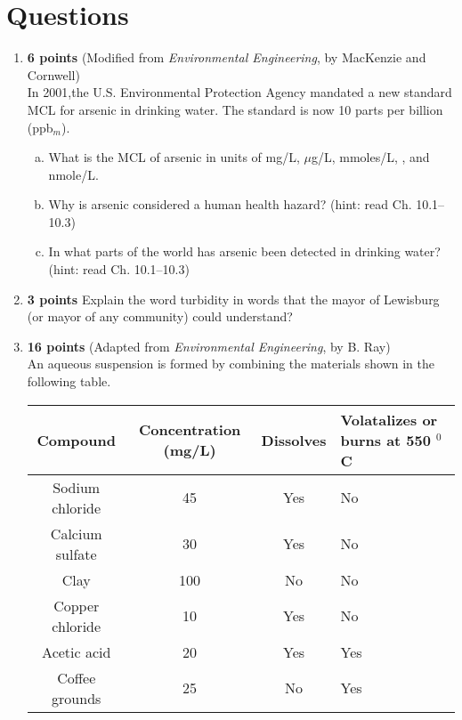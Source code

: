 \documentclass[12pt,letterpaper]{article}
\begin{document}
\section *{Questions}
\begin{enumerate}
\item \textbf{6 points} (Modified from \emph{Environmental Engineering}, by MacKenzie and Cornwell)\\
In 2001,the U.S. Environmental Protection Agency mandated a new standard MCL for arsenic in drinking water.  The standard is now 10 parts per billion (ppb$_m$). 
\begin{enumerate}[a)]
\item What is the MCL of arsenic in units of mg/L, $\mu$g/L, mmoles/L, , and nmole/L.
\item Why is arsenic considered a human health hazard? (hint: read Ch. 10.1--10.3)
\item In what parts of the world has arsenic been detected in drinking water?(hint: read Ch. 10.1--10.3)
\end{enumerate}

\item 
\textbf{3 points} Explain the word turbidity in words that the mayor of Lewisburg (or mayor of any community) could understand?

\item \textbf{16 points} (Adapted from \emph{Environmental Engineering}, by B. Ray)\\
An aqueous suspension is formed by combining the materials shown in the following table.  

\begin{minipage}{\linewidth}
\centering
{} \label{tab:title}

\begin{tabular}{|c|c|c|p{3.1cm}|}\toprule[1.25pt]
\bf Compound	& \bf Concentration (mg/L)	& \bf Dissolves 	& \bf Volatalizes or burns at 550 $^0$C \\\midrule
Sodium chloride	& 45 	& Yes & No\\ \hline
Calcium sulfate	& 30 	& Yes	& No\\ \hline
Clay & 100	& No 	& No \\  \hline
Copper chloride & 10 	& Yes & No \\  \hline
Acetic acid	& 20 & Yes & Yes\\		\hline
Coffee grounds	& 25 	& No & Yes \\		\hline
\bottomrule[1.25pt]


\end{tabular}
\end{minipage}
\end{enumerate}
\end{document}
